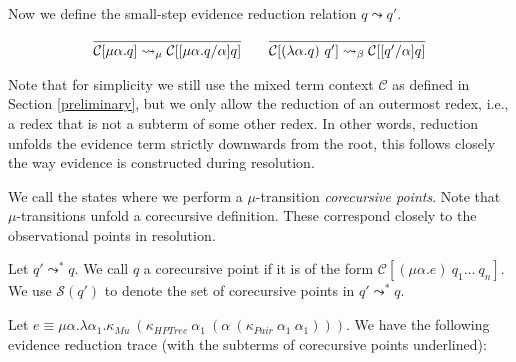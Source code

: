 \documentclass{llncs}
\newcommand{\Conid}[1]{\mathit{#1}}
\begin{document}
Now we define the small-step evidence reduction relation $q \leadsto q'$.
\begin{definition}
  \label{label}
{\small
\[\begin{array}{c}

\infer{{\mathcal{C}[\mu \alpha . q]} \leadsto_\mu \mathcal{C}[[\mu \alpha . q/\alpha]q]}{} 
\quad \quad
\infer{\mathcal{C}[(\lambda \alpha . q) \ q'] \leadsto_\beta \mathcal{C}[[q'/\alpha] q] }{}

  \end{array}
\]}

\end{definition}
Note that for simplicity we still use the mixed term context $\mathcal{C}$ as defined in
Section \ref{preliminary}, but we only allow the reduction of an outermost redex, i.e.,
a redex that is not a subterm of some other redex. In other words, 
reduction unfolds the evidence term strictly downwards from the
root, this follows closely the way evidence is constructed during
resolution.

We call the states where we perform a $\mu$-transition \emph{corecursive points}.
Note that $\mu$-transitions unfold
 a corecursive definition.
These
correspond closely to the observational points in resolution.

\begin{definition}
Let $q' \leadsto^* q$. We call $q$ a corecursive point if it is of the form $\mathcal{C}[(\mu \alpha.e) \ q_1 ...\ q_n]$. We use $\mathcal{S}(q')$ to denote the set of corecursive points in $q' \leadsto^* q$.  
 \end{definition}


Let $e \equiv \mu \alpha . \lambda \alpha_1 . \kappa_{\ensuremath{\Conid{Mu}}}\ (\kappa_{\ensuremath{\Conid{HPTree}}}\ \alpha_1\  (\alpha\ (\kappa_{\ensuremath{\Conid{Pair}}}\ \alpha_1\ \alpha_1)))$. We have the following evidence reduction trace (with the subterms of corecursive points underlined):
\end{document}
